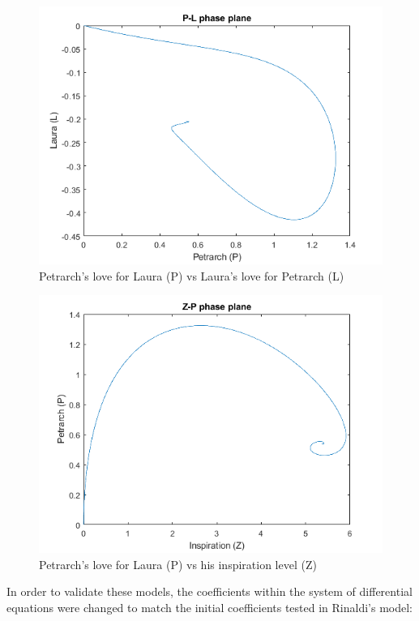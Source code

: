 \documentclass[11pt]{article}
\begin{document}
\begin{figure} [!h]
\centering
        \includegraphics[totalheight=7.5cm]{love2.png}
    \caption{Petrarch's love for Laura (P) vs Laura's love for Petrarch (L)}
    \label{figure11}
\end{figure}

\begin{figure} [!h]
\centering
        \includegraphics[totalheight=7.5cm]{love3.png}
    \caption{Petrarch's love for Laura (P) vs his inspiration level (Z)}
    \label{figure12}
\end{figure}

\newpage

In order to validate these models, the coefficients within the system of differential
equations were changed to match the initial coefficients tested in Rinaldi's 
model:
\end{document}
